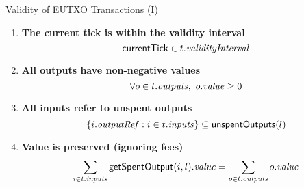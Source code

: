 \begin{frame}{Validity of EUTXO Transactions (I)}

\begin{enumerate}
\item
  \label{rule:tick-in-range}
  \textbf{The current tick is within the validity interval}
  \begin{displaymath}
    \mathsf{currentTick} \in t.\mathit{validityInterval}
  \end{displaymath}

\item
  \label{rule:all-outputs-are-non-negative}
  \textbf{All outputs have non-negative values}
  \begin{displaymath}
    \forall o \in t.\mathit{outputs},\ o.\mathit{value} \geq 0
  \end{displaymath}

\item
  \label{rule:all-inputs-refer-to-unspent-outputs}
  \textbf{All inputs refer to unspent outputs}
  \begin{displaymath}
    \{i.\mathit{outputRef} : i \in t.\mathit{inputs} \} \subseteq \mathsf{unspentOutputs}(l)
  \end{displaymath}

\item
  \label{rule:value-is-preserved}
  \textbf{Value is preserved (ignoring fees)}
  \begin{displaymath}
    \sum_{i \in t.\mathit{inputs}} \mathsf{getSpentOutput}(i, l).\mathit{value} = \sum_{o \in t.\mathit{outputs}} o.\mathit{value}
  \end{displaymath}

\seti
\end{enumerate}

\end{frame}

